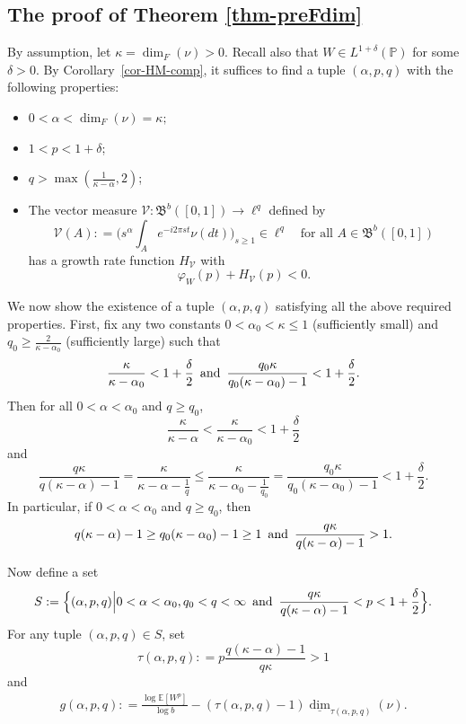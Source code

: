 \documentclass[12pt]{amsart}
\theoremstyle{definition}
\theoremstyle{remark}
\newcommand{\E}{\mathbb{E}}
\newcommand{\PP}{\mathbb{P}}
\newcommand{\ldim}{\underline{\dim}}
\newcommand{\an}{\text{\, and \,}}
\numberwithin{equation}{section}
\begin{document}
\subsection{The proof of Theorem \ref{thm-preFdim}}
By assumption, let $\kappa = \dim_F(\nu)>0$. Recall also that $W\in L^{1+\delta}(\PP)$ for some $\delta>0$.    By Corollary~\ref{cor-HM-comp}, it suffices to find  a tuple $(\alpha, p, q)$ with  the following properties: 
\begin{itemize}
\item 
$
0< \alpha< \dim_F(\nu) = \kappa;
$
\item $1< p<1 + \delta$; 
\item $q>\max(\frac{1}{\kappa - \alpha}, 2)$; 
\item The vector measure $\mathcal{V}: \mathfrak{B}^b([0,1]) \rightarrow \ell^q$ defined by
\[
\mathcal{V}(A): =   \Big( s^\alpha \int_{A}e^{-i 2\pi st}\nu(dt) \Big)_{s\ge 1} \in \ell^q \quad \text{for all $A\in \mathfrak{B}^b([0,1])$}
\]
has a growth rate function $H_\mathcal{V}$ with 
\[
\varphi_W(p) + H_\mathcal{V}(p)<0. 
\]
\end{itemize}



We now show the existence of  a tuple $(\alpha, p, q)$ satisfying  all the above  required properties.  First, fix any two constants $0< \alpha_0<\kappa \le 1$ (sufficiently small) and $q_0\ge \frac{2}{\kappa- \alpha_0}$ (sufficiently large)  such that 
\[
\frac{\kappa}{\kappa-\alpha_0} < 1 +\frac{\delta}{2} \an \frac{q_0\kappa}{q_0(\kappa-\alpha_0) -1}< 1+\frac{\delta}{2}. 
\]
Then for all $0< \alpha< \alpha_0$ and $q\ge q_0$, 
\[
\frac{\kappa}{\kappa-\alpha}  < \frac{\kappa}{\kappa-\alpha_0} < 1 + \frac{\delta}{2}
\]
and 
\[
   \frac{q\kappa}{q(\kappa-\alpha) -1}  = \frac{\kappa}{\kappa - \alpha - \frac{1}{q}} \le \frac{\kappa}{\kappa - \alpha_0 - \frac{1}{q_0}}   =   \frac{q_0\kappa}{q_0(\kappa-\alpha_0) -1} < 1 + \frac{\delta}{2}.
\]
In particular, if $0< \alpha< \alpha_0$ and $q\ge q_0$,  then 
\[
q(\kappa - \alpha) - 1 \ge q_0(\kappa- \alpha_0)-1 \ge 1 \an 
\frac{q\kappa}{q(\kappa-\alpha)-1}>1.
\]

Now define a set 
\[
S : = \Big\{(\alpha, p, q)\Big|  0< \alpha< \alpha_0,  q_0 < q < \infty \an  \frac{q\kappa}{q (\kappa-\alpha)-1}<p < 1+\frac{\delta}{2}\Big\}. 
\]
For any tuple $(\alpha, p, q)\in S$,  set 
\[
\tau(\alpha, p, q): = p \frac{q(\kappa- \alpha)-1}{q\kappa}>1
\]
and
\begin{align*}
  g(\alpha, p, q): =   \frac{\log \E[W^p]}{\log b} - (\tau(\alpha, p, q)- 1) \ldim_{\tau(\alpha, p, q)}(\nu).
\end{align*}
\end{document}
